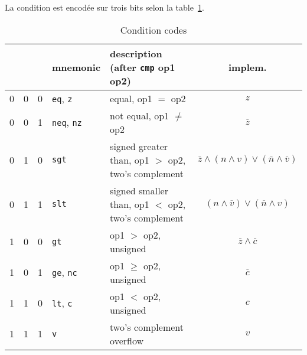\documentclass[architecture]{compas2018}
\begin{document}
La condition  est encodée sur trois bits  selon la table~\ref{tab:conditions}.
\newcommand{\bool}{\mathbb{B}}
\newcommand{\booland}{\wedge}
\newcommand{\boolor}{\vee}
\newcommand{\boolnot}[1]{\overline{#1}}
\begin{table} 
  \caption{Condition codes}
  \label{tab:conditions}
\begin{center}
  \begin{tabular}{|c|c|c||l||l|c|}
    \hline  
      &   &   & mnemonic                  & description (after \texttt{cmp} op1 op2)           & {implem.}                                                                           \\
    \hline  
    \hline  
    0 & 0 & 0 & \texttt{eq}, \texttt{z}   & equal, op1 $=$ op2                                 & $z$                                                                                 \\
    \hline
    0 & 0 & 1 & \texttt{neq}, \texttt{nz} & not equal, op1 $\neq$ op2                          & $\boolnot{z}$                                                                       \\
    \hline
    0 & 1 & 0 & \texttt{sgt}              & signed greater than, op1 $>$ op2, two's complement & $\boolnot{z} \booland (n \booland {v}) \boolor (\boolnot{n} \booland \boolnot{v}) $ \\
    \hline
    0 & 1 & 1 & \texttt{slt}              & signed smaller than, op1 $<$ op2, two's complement & $(n \booland \boolnot{v}) \boolor (\boolnot{n} \booland v) $                        \\
    \hline
    1 & 0 & 0 & \texttt{gt}               & op1 $>$ op2, unsigned                              & $\boolnot{z} \booland \boolnot{c}$                                                  \\
    \hline
    1 & 0 & 1 & \texttt{ge}, \texttt{nc}  & op1 $\ge$ op2, unsigned                            & $\boolnot{c}$                                                                       \\
    \hline
    1 & 1 & 0 & \texttt{lt}, \texttt{c}   & op1 $<$ op2, unsigned                              & $c$                                                                                 \\
    \hline
    1 & 1 & 1 & {\texttt{v}}              & {two's complement overflow}                        & {$v$}                                                                               \\
    \hline
  \end{tabular}
\end{center}
\end{table} 
\end{document}

